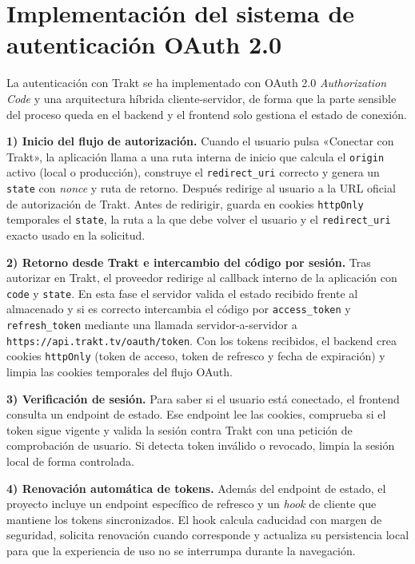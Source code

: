 \section{Implementación del sistema de autenticación OAuth 2.0}

La autenticación con Trakt se ha implementado con OAuth 2.0 \textit{Authorization Code} \parencite{NextJS:2024,OWASP:2021} y una arquitectura híbrida cliente-servidor, de forma que la parte sensible del proceso queda en el backend y el frontend solo gestiona el estado de conexión.

\textbf{1) Inicio del flujo de autorización.} Cuando el usuario pulsa «Conectar con Trakt», la aplicación llama a una ruta interna de inicio que calcula el \texttt{origin} activo (local o producción), construye el \texttt{redirect\_uri} correcto y genera un \texttt{state} con \textit{nonce} y ruta de retorno. Después redirige al usuario a la URL oficial de autorización de Trakt. Antes de redirigir, guarda en cookies \texttt{httpOnly} temporales el \texttt{state}, la ruta a la que debe volver el usuario y el \texttt{redirect\_uri} exacto usado en la solicitud.

\textbf{2) Retorno desde Trakt e intercambio del código por sesión.} Tras autorizar en Trakt, el proveedor redirige al callback interno de la aplicación con \texttt{code} y \texttt{state}. En esta fase el servidor valida el estado recibido frente al almacenado y si es correcto intercambia el código por \texttt{access\_token} y \texttt{refresh\_token} mediante una llamada servidor-a-servidor a \texttt{https://api.trakt.tv/oauth/token}. Con los tokens recibidos, el backend crea cookies \texttt{httpOnly} (token de acceso, token de refresco y fecha de expiración) y limpia las cookies temporales del flujo OAuth.

\textbf{3) Verificación de sesión.} Para saber si el usuario está conectado, el frontend consulta un endpoint de estado. Ese endpoint lee las cookies, comprueba si el token sigue vigente y valida la sesión contra Trakt con una petición de comprobación de usuario. Si detecta token inválido o revocado, limpia la sesión local de forma controlada.

\textbf{4) Renovación automática de tokens.} Además del endpoint de estado, el proyecto incluye un endpoint específico de refresco y un \textit{hook} de cliente que mantiene los tokens sincronizados. El hook calcula caducidad con margen de seguridad, solicita renovación cuando corresponde y actualiza su persistencia local para que la experiencia de uso no se interrumpa durante la navegación.

